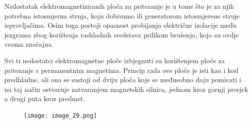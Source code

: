 \documentclass[a4paper,12pt]{article}
\numberwithin{figure}{section}
\begin{document}
Nedostatak elektromagnetiziranih ploča za pritezanje je u tome što je za njih potrebna istosmjerna struja, koju dobivamo ili generatorom istosmjerene struje ispravljačima. Osim toga postoji opasnost probijanja električne izolacije među jezgrama zbog korištenja rashladnih sredstava prilikom brušenja, koja su ovdje veoma značajna.\par
Svi ti nedostatci elektromagnetne ploče izbjegnuti su korištenjem ploče za pritezanje s permanentnim magnetima. Princip rada ove ploče je isti kao i kod predhladne, ali ona se sastoji od dviju ploča koje se međusobno daju pomicati i na taj način ostvaruje zatvaranjem magnetskih silnica, jednom kroz gornji presjek a drugi puta kroz predmet. 
\begin{figure}[!h]
\centering
\texttt{[image: image\_29.png]}
\end{figure}
\FloatBarrier
\end{document}
